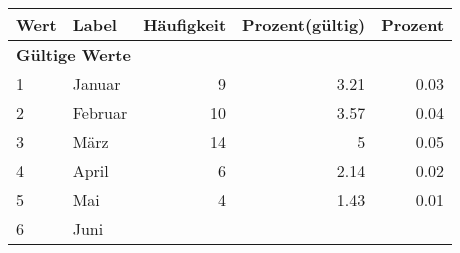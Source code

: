      \begin{longtable}{lXrrr}
     \toprule
     \textbf{Wert} & \textbf{Label} & \textbf{Häufigkeit} & \textbf{Prozent(gültig)} & \textbf{Prozent} \\
     \endhead
     \midrule
     \multicolumn{5}{l}{\textbf{Gültige Werte}}\\

     1 &
     \multicolumn{1}{X}{ Januar   } &


       \num{9} &
       \num[round-mode=places,round-precision=2]{3,21} &
         \num[round-mode=places,round-precision=2]{0,03} \\

     2 &
     \multicolumn{1}{X}{ Februar   } &


       \num{10} &
       \num[round-mode=places,round-precision=2]{3,57} &
         \num[round-mode=places,round-precision=2]{0,04} \\

     3 &
     \multicolumn{1}{X}{ März   } &


       \num{14} &
       \num[round-mode=places,round-precision=2]{5} &
         \num[round-mode=places,round-precision=2]{0,05} \\

     4 &
     \multicolumn{1}{X}{ April   } &


       \num{6} &
       \num[round-mode=places,round-precision=2]{2,14} &
         \num[round-mode=places,round-precision=2]{0,02} \\

     5 &
     \multicolumn{1}{X}{ Mai   } &


       \num{4} &
       \num[round-mode=places,round-precision=2]{1,43} &
         \num[round-mode=places,round-precision=2]{0,01} \\

     6 &
     \multicolumn{1}{X}{ Juni   } &



\end{longtable}
